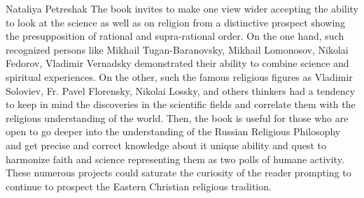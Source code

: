 \begin{recplenv}{Nataliya Petreshak}
The book invites to make one view wider accepting the ability to look at the science as well as on religion from a
distinctive prospect showing the presupposition of rational and supra-rational order. On the one hand, such recognized
persons like Mikhail Tugan-Baranovsky, Mikhail Lomonosov, Nikolai Fedorov, Vladimir Vernadsky demonstrated their
ability to combine science and spiritual experiences. On the other, such the famous religious figures as Vladimir
Soloviev, Fr. Pavel Florensky, Nikolai Lossky, and others thinkers had a tendency to keep in mind the discoveries in
the scientific fields and correlate them with the religious understanding of the world. Then, the book is useful for
those who are open to go deeper into the understanding of the Russian Religious Philosophy and get precise and correct
knowledge about it unique ability and quest to harmonize faith and science representing them as two polls of humane
activity. These numerous projects could saturate the curiosity of the reader prompting to continue to prospect the
Eastern Christian religious tradition.



\end{recplenv}

